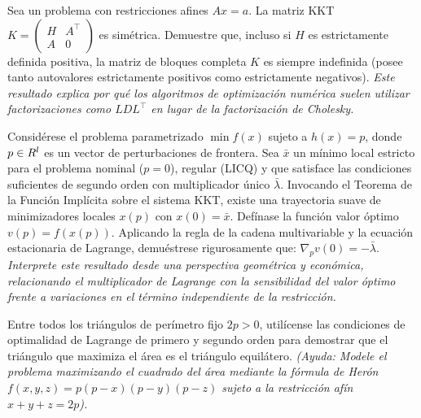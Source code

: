 \begin{exercise}\label{v1:ejer:2.16}
 Sea un problema con restricciones afines $Ax = a$. La matriz KKT $K = \begin{pmatrix} H & A^\top \\ A & 0 \end{pmatrix}$ es simétrica. Demuestre que, incluso si $H$ es estrictamente definida positiva, la matriz de bloques completa $K$ es siempre indefinida (posee tanto autovalores estrictamente positivos como estrictamente negativos). \textit{Este resultado explica por qué los algoritmos de optimización numérica suelen utilizar factorizaciones como $LDL^\top$ en lugar de la factorización de Cholesky.}
\end{exercise}


\begin{exercise}\label{v1:ejer:2.17}
 Considérese el problema parametrizado $\min f(x)$ sujeto a $h(x) = p$, donde $p \in R^l$ es un vector de perturbaciones de frontera. Sea $\bar{x}$ un mínimo local estricto para el problema nominal ($p = 0$), regular (LICQ) y que satisface las condiciones suficientes de segundo orden con multiplicador único $\bar{\lambda}$. Invocando el Teorema de la Función Implícita sobre el sistema KKT, existe una trayectoria suave de minimizadores locales $x(p)$ con $x(0) = \bar{x}$. Defínase la función valor óptimo $v(p) = f(x(p))$. Aplicando la regla de la cadena multivariable y la ecuación estacionaria de Lagrange, demuéstrese rigurosamente que: $\nabla_p v(0) = -\bar{\lambda}$. \textit{Interprete este resultado desde una perspectiva geométrica y económica, relacionando el multiplicador de Lagrange con la sensibilidad del valor óptimo frente a variaciones en el término independiente de la restricción.}
\end{exercise}

\begin{exercise}\label{v1:ejer:2.18}
	Entre todos los triángulos de perímetro fijo $2p > 0$, utilícense las condiciones de optimalidad de Lagrange de primero y segundo orden para demostrar que el triángulo que maximiza el área es el triángulo equilátero. \textit{(Ayuda: Modele el problema maximizando el cuadrado del área mediante la fórmula de Herón $f(x,y,z) = p(p-x)(p-y)(p-z)$ sujeto a la restricción afín $x+y+z = 2p$).}
\end{exercise}

